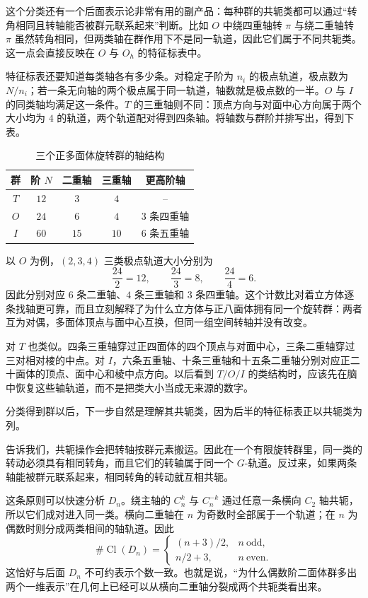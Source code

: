这个分类还有一个后面表示论非常有用的副产品：每种群的共轭类都可以通过“转角相同且转轴能否被群元联系起来”判断。比如 $O$ 中绕四重轴转 $\pi$ 与绕二重轴转 $\pi$ 虽然转角相同，但两类轴在群作用下不是同一轨道，因此它们属于不同共轭类。这一点会直接反映在 $O$ 与 $O_h$ 的特征标表中。

特征标表还要知道每类轴各有多少条。对稳定子阶为 $n_i$ 的极点轨道，极点数为 $N/n_i$；若一条无向轴的两个极点属于同一轨道，轴数就是极点数的一半。$O$ 与 $I$ 的同类轴均满足这一条件。$T$ 的三重轴则不同：顶点方向与对面中心方向属于两个大小均为 $4$ 的轨道，两个轨道配对得到四条轴。将轴数与群阶并排写出，得到下表。

\begin{table}[htbp]
\centering
\caption{三个正多面体旋转群的轴结构}
\label{tab:polyhedral-axis-count}
\begin{tabular}{c|c|c|c|c}
\toprule
群 & 阶 $N$ & 二重轴 & 三重轴 & 更高阶轴 \\
\midrule
$T$ & $12$ & $3$ & $4$ & -- \\
$O$ & $24$ & $6$ & $4$ & $3$ 条四重轴 \\
$I$ & $60$ & $15$ & $10$ & $6$ 条五重轴 \\
\bottomrule
\end{tabular}
\end{table}

以 $O$ 为例，$(2,3,4)$ 三类极点轨道大小分别为
\[
\frac{24}{2}=12,
\qquad
\frac{24}{3}=8,
\qquad
\frac{24}{4}=6.
\]
因此分别对应 $6$ 条二重轴、$4$ 条三重轴和 $3$ 条四重轴。这个计数比对着立方体逐条找轴更可靠，而且立刻解释了为什么立方体与正八面体拥有同一个旋转群：两者互为对偶，多面体顶点与面中心互换，但同一组空间转轴并没有改变。

对 $T$ 也类似。四条三重轴穿过正四面体的四个顶点与对面中心，三条二重轴穿过三对相对棱的中点。对 $I$，六条五重轴、十条三重轴和十五条二重轴分别对应正二十面体的顶点、面中心和棱中点方向。以后看到 $T/O/I$ 的类结构时，应该先在脑中恢复这些轴轨道，而不是把类大小当成无来源的数字。

分类得到群以后，下一步自然是理解其共轭类，因为后半的特征标表正以共轭类为列。

 告诉我们，共轭操作会把转轴按群元素搬运。因此在一个有限旋转群里，同一类的转动必须具有相同转角，而且它们的转轴属于同一个 $G$-轨道。反过来，如果两条轴能被群元联系起来，相同转角的转动就互相共轭。

这条原则可以快速分析 $D_n$。绕主轴的 $C_n^k$ 与 $C_n^{-k}$ 通过任意一条横向 $C_2$ 轴共轭，所以它们成对进入同一类。横向二重轴在 $n$ 为奇数时全部属于一个轨道；在 $n$ 为偶数时则分成两类相间的轴轨道。因此
\[
\#\operatorname{Cl}(D_n)=
\begin{cases}
(n+3)/2,&n\ \text{odd},\\
n/2+3,&n\ \text{even}.
\end{cases}
\]
这恰好与后面 $D_n$ 不可约表示个数一致。也就是说，“为什么偶数阶二面体群多出两个一维表示”在几何上已经可以从横向二重轴分裂成两个共轭类看出来。

